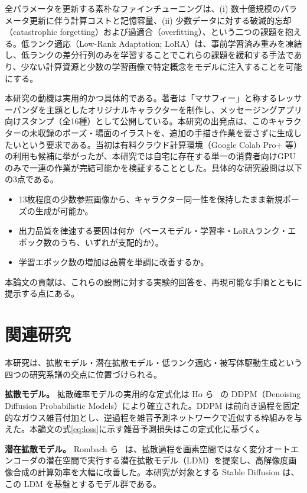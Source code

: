 \documentclass[10pt,twocolumn]{ltjsarticle}
\begin{document}
全パラメータを更新する素朴なファインチューニングは、(i) 数十億規模のパラメータ更新に伴う計算コストと記憶容量、(ii) 少数データに対する破滅的忘却（catastrophic forgetting）および過適合（overfitting）、という二つの課題を抱える。低ランク適応（Low-Rank Adaptation; LoRA）は、事前学習済み重みを凍結し、低ランクの差分行列のみを学習することでこれらの課題を緩和する手法であり、少ない計算資源と少数の学習画像で特定概念をモデルに注入することを可能にする。

本研究の動機は実用的かつ具体的である。著者は「マサフィー」と称するレッサーパンダを主題としたオリジナルキャラクターを制作し、メッセージングアプリ向けスタンプ（全16種）として公開している。本研究の出発点は、このキャラクターの未収録のポーズ・場面のイラストを、追加の手描き作業を要さずに生成したいという要求である。当初は有料クラウド計算環境（Google Colab Pro+ 等）の利用も候補に挙がったが、本研究では自宅に存在する単一の消費者向けGPUのみで一連の作業が完結可能かを検証することとした。具体的な研究設問は以下の3点である。
\begin{itemize}[leftmargin=2.2em,topsep=2pt,itemsep=1pt]
  \item[\textbf{Q1.}] 13枚程度の少数参照画像から、キャラクター同一性を保持したまま新規ポーズの生成が可能か。
  \item[\textbf{Q2.}] 出力品質を律速する要因は何か（ベースモデル・学習率・LoRAランク・エポック数のうち、いずれが支配的か）。
  \item[\textbf{Q3.}] 学習エポック数の増加は品質を単調に改善するか。
\end{itemize}
本論文の貢献は、これらの設問に対する実験的回答を、再現可能な手順とともに提示する点にある。

\section{関連研究}
本研究は、拡散モデル・潜在拡散モデル・低ランク適応・被写体駆動生成という四つの研究系譜の交点に位置づけられる。

\textbf{拡散モデル。} 拡散確率モデルの実用的な定式化は Ho ら~\cite{ho2020ddpm} の DDPM（Denoising Diffusion Probabilistic Models）により確立された。DDPM は前向き過程を固定的なガウス雑音付加とし、逆過程を雑音予測ネットワークで近似する枠組みを与えた。本論文の式\eqref{eq:loss}に示す雑音予測損失はこの定式化に基づく。

\textbf{潜在拡散モデル。} Rombach ら~\cite{rombach2022ldm} は、拡散過程を画素空間ではなく変分オートエンコーダの潜在空間で実行する潜在拡散モデル（LDM）を提案し、高解像度画像合成の計算効率を大幅に改善した。本研究が対象とする Stable Diffusion は、この LDM を基盤とするモデル群である。
\end{document}
